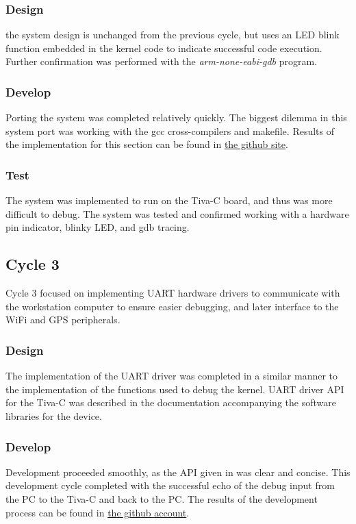 \documentclass{article}
\begin{document}
\subsubsection*{Design}
the system design is unchanged from the previous cycle, but uses an LED blink function embedded in the kernel code to indicate successful code execution.  Further confirmation was performed with the \emph{arm-none-eabi-gdb} program.

\subsubsection*{Develop}
Porting the system was completed relatively quickly.  The biggest dilemma in this system port was working with the gcc cross-compilers and makefile.  Results of the implementation for this section can be found in \href{https://github.com/Shamshel/ECE5770/commit/7a165da5f1471905e4bebfb925ed24c03c95f8b4}{the github site}.

\subsubsection*{Test}
The system was implemented to run on the Tiva-C board, and thus was more difficult to debug.  The system was tested and confirmed working with a hardware pin indicator, blinky LED, and gdb tracing.

\subsection*{Cycle 3}

Cycle 3 focused on implementing UART hardware drivers to communicate with the workstation computer to ensure easier debugging, and later interface to the WiFi and GPS peripherals.

\subsubsection*{Design}
The implementation of the UART driver was completed in a similar manner to the implementation of the functions used to debug the kernel.  UART driver API for the Tiva-C was described in the documentation accompanying the software libraries for the device\cite{SW-TM4C}.

\subsubsection*{Develop}
Development proceeded smoothly, as the API given in \cite{SW-TM4C} was clear and concise.  This development cycle completed with the successful echo of the debug input from the PC to the Tiva-C and back to the PC. The results of the development process can be found in \href{https://github.com/Shamshel/ECE5770/commit/0b449546cf80b91c1b842a0b21c7e088970f24e6}{the github account}.
\end{document}
